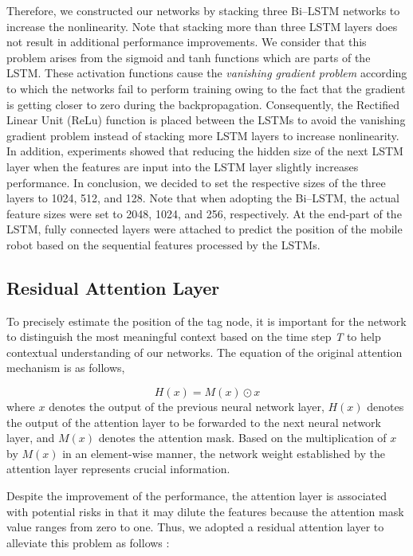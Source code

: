 \documentclass[letterpaper, 10 pt, conference]{ieeeconf}
\begin{document}
Therefore, we constructed our networks by stacking three Bi--LSTM networks to increase the nonlinearity. Note that stacking more than three LSTM layers does not result in additional performance improvements. We consider that this problem arises from the sigmoid and tanh functions which are parts of the LSTM. These activation functions cause the \textit{vanishing gradient problem} \cite{pascanu2013difficulty} according to which the networks fail to perform training owing to the fact that the gradient is getting closer to zero during the backpropagation. Consequently, the Rectified Linear Unit (ReLu) function is placed between the LSTMs to avoid the vanishing gradient problem \cite{nair2010rectified} instead of stacking more LSTM layers to increase nonlinearity. In addition, experiments showed that reducing the hidden size of the next LSTM layer when the features are input into the LSTM layer slightly increases performance. In conclusion, we decided to set the respective sizes of the three layers to 1024, 512, and 128. Note that when adopting the Bi--LSTM, the actual feature sizes were set to 2048, 1024, and 256, respectively. At the end-part of the LSTM, fully connected layers were attached to predict the position of the mobile robot based on the sequential features processed by the LSTMs.  

\subsection{Residual Attention Layer}

To precisely estimate the position of the tag node, it is important for the network to distinguish the most meaningful context based on the time step \textit{T} to help contextual understanding of our networks. The equation of the original attention mechanism is as follows,   

\begin{equation}
H(x)=M(x)\odot x
\end{equation} 
where $x$ denotes the output of the previous neural network layer, $H(x)$ denotes the output of the attention layer to be forwarded to the next neural network layer, and $M(x)$ denotes the attention mask. Based on the multiplication of $x$ by $M(x)$ in an element-wise manner, the network weight established by the attention layer represents crucial information. 

Despite the improvement of the performance, the attention layer is associated with potential risks in that it may dilute the features because the attention mask value ranges from zero to one. Thus, we adopted a residual attention layer to alleviate this problem as follows \cite{wang2017residual}:
\end{document}
